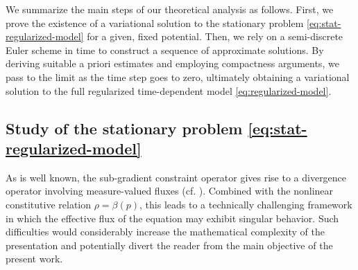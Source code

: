\documentclass[final,reqno]{amsart}
\theoremstyle{plain}
\theoremstyle{definition}
\theoremstyle{remark}
\numberwithin{remark}{section}	%
\numberwithin{example}{section}	%
\begin{document}
We summarize the main steps of our theoretical analysis as follows. First, we prove the existence of a variational solution to the stationary problem \eqref{eq:stat-regularized-model} for a given, fixed potential. Then, we rely on a semi-discrete Euler scheme in time to construct a sequence of approximate solutions. By deriving suitable a priori estimates and employing compactness arguments, we pass to the limit as the time step goes to zero, ultimately obtaining a variational solution to the full regularized time-dependent model \eqref{eq:regularized-model}.



 

\subsection{Study of the stationary problem \eqref{eq:stat-regularized-model}}


As is well known, the sub-gradient constraint operator gives rise to a divergence operator involving measure-valued fluxes (cf. \cite{Ig1, Ig2, DePascale&Jimenez}). Combined with the nonlinear constitutive relation
$\rho=\beta(p)$, this leads to a technically challenging framework in which the effective flux of the equation may exhibit singular behavior. Such difficulties would considerably increase the mathematical complexity of the presentation and potentially divert the reader from the main objective of the present work.
\end{document}
